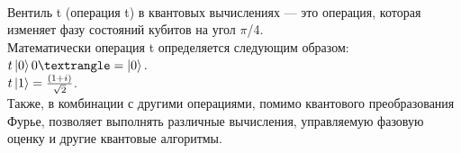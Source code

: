 \documentclass[12pt,a4paper]{article}
\begin{document}
		\hspace{1em}\\
		Вентиль t (операция t) в квантовых вычислениях — это операция, которая изменяет фазу состояний кубитов на угол $\pi$/4.\\
		
		Математически операция t определяется следующим образом:\\
		$t \ket{0} 0⟩ =\ket{0}.$\\
		$t \ket{1} = \frac{(1+i)}{\sqrt{2}} $.\\
		
		Также, в комбинации с другими операциями, помимо квантового преобразования Фурье, позволяет выполнять различные вычисления, управляемую фазовую оценку и другие квантовые алгоритмы.\\
		
\end{document}
